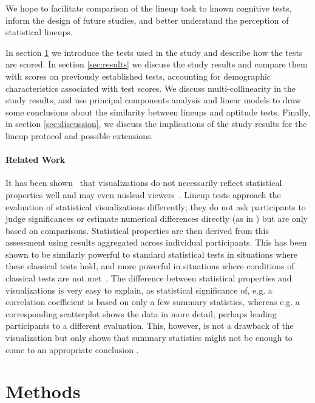 \documentclass[journal]{vgtc}\usepackage[]{graphicx}\usepackage[]{color}
\begin{document}
We hope to facilitate comparison of the lineup task to known cognitive tests, inform the design of future studies, and better understand the perception of statistical lineups. 


In section \ref{sec:methods} we introduce the tests used in the study and describe how the tests are scored. In section \ref{sec:results} we discuss the study results and compare them with scores on previously established tests, accounting for demographic characteristics associated with test scores. We discuss multi-collinearity in the study results, and use principal components analysis and linear models to draw some conclusions about the similarity between lineups and aptitude tests. Finally, in section \ref{sec:discussion}, we discuss the implications of the study results for the lineup protocol and  possible extensions. 

\paragraph{Related Work}
It has been shown~\cite{pak2014} that visualizations do not necessarily reflect statistical properties well and may even mislead viewers~\cite{correll2013}. Lineup tests approach the evaluation of statistical visualizations differently; they do not ask participants to judge significances or estimate numerical differences directly (as in \cite{cleveland:1985, fuchs, talbot}) but are only based on comparisons. Statistical properties are then derived from this assessment using results aggregated across individual participants.  This has been shown to be similarly powerful to standard statistical tests in situations where these classical tests hold, and more powerful in situations where conditions of classical tests are not met~\cite{majumder2013validation}. The difference between statistical properties and visualizations is very easy to explain, as statistical significance of, e.g. a correlation coefficient is based on only a few summary statistics, whereas e.g. a corresponding scatterplot shows the data in more detail, perhaps leading participants to a different evaluation. This, however, is not a drawback of the visualization but only shows that summary statistics might not be enough to come to an appropriate conclusion \cite{anscombe:1973}. 

\section{Methods}\label{sec:methods}
\end{document}

